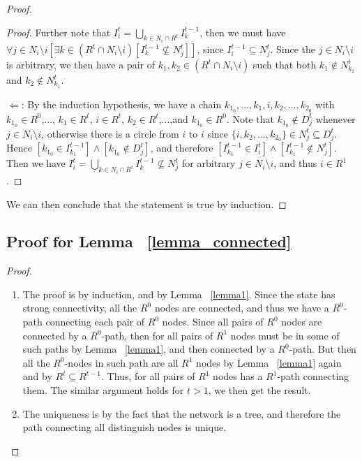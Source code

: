 \documentclass[12pt]{article}
\theoremstyle{remark}
\theoremstyle{remark}
\begin{document}
\begin{proof}
\begin{proof}
Further note that $I^t_i = \bigcup_{k\in N_i\cap R^t}I^{t-1}_k$, then we must have $\forall j\in N_i\setminus i [\exists k\in (R^t\cap N_i\setminus i)[ I^{t-1}_k\nsubseteq N^t_j]]$, since $I^{t-1}_i\subseteq N^t_{j}$. Since the $j\in N_i\setminus i$ is arbitrary,  we then have a pair of $k_1, k_2 \in (R^t\cap N_i\setminus i)$ such that both $k_1\notin N^t_{k_2}$ and $k_2\notin N^t_{k_1}$.
\bigskip

$\Leftarrow$:
By the induction hypothesis, we have a chain $k_{1_0},...,k_1,i,k_2,...,k_{2_0}$ with $k_{1_0}\in R^0$,..., $k_1\in R^t$, $i\in R^t$, $k_2\in R^t$,...,and $k_{1_0}\in R^0$. Note that $k_{1_0}\notin D^t_j$ whenever $j\in N_i\setminus i$, otherwise there is a circle from $i$ to $i$ since $\{i,k_2,...,k_{2_0}\}\in N^t_j\subseteq D^t_j$. Hence $[k_{1_0}\in I^{t-1}_{k_1}] \wedge [k_{1_0}\notin D^t_j]$, and therefore $[I^{t-1}_{k_1}\in I^t_i] \wedge [I^{t-1}_{k_1}\notin N^t_j]$. Then we have $I^t_i=\bigcup_{k\in N_i\cap R^{t}}I^{t-1}_k\nsubseteq N^t_j$ for arbitrary $j\in N_i\setminus i$, and thus $i\in R^1$.

\end{proof}

We can then conclude that the statement is true by induction.

\end{proof}

\subsection{Proof for Lemma ~\ref{lemma_connected}}
\begin{proof}
\begin{enumerate}
\item The proof is by induction, and by Lemma ~\ref{lemma1}. Since the state has strong connectivity, all the $R^0$ nodes are connected, and thus we have a $R^0$-path connecting each pair of $R^0$ nodes. Since all pairs of $R^0$ nodes are connected by a $R^0$-path, then for all pairs of $R^1$ nodes must be in some of such paths by Lemma ~\ref{lemma1}, and then connected by a $R^0$-path. But then all the $R^0$-nodes in such path are all $R^1$ nodes by Lemma ~\ref{lemma1} again and by $R^t\subseteq R^{t-1}$. Thus, for all pairs of $R^1$ nodes has a $R^1$-path connecting them. The similar argument holds for $t> 1$, we then get the result.
\item The uniqueness is by the fact that the network is a tree, and therefore the path connecting all distinguish nodes is unique.   
\end{enumerate}
\end{proof}
\end{document}
